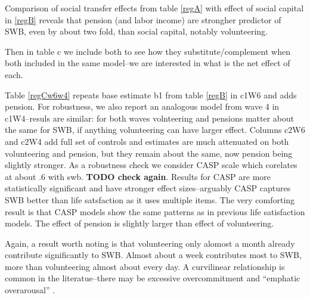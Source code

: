\documentclass[10pt, letterpaper]{article}
\begin{document}
\begin{spacing}{1.4}
Comparison of social transfer effects from table \ref{regA} with effect of 
 social capital in \ref{regB} reveals that pension (and labor income) are
 strongher  predictor of SWB, even by about two fold,  than social capital, notably volunteering.

Then in table c we include both to see how they substitute/complement
when both included in the same model--we are interested in what is the net
effect of each.

Table \ref{regCw6w4} repeats base estimate b1 from table \ref{regB} in c1W6 and
adds pension. For
robustness, we also report an analogous model from wave 4 in c1W4--resuls are
similar: for both waves volnteering and pensions matter about the same for SWB,
if anything volunteering can have larger effect.
% 
Columns c2W6 and c2W4 add full set of controls and estimates are much attenuated
on both volunteering and pension, but they remain about the same, now pension
being slightly stronger.
%
As a robustness check we consider CASP scale which corelates at about .6 with
swb. \textbf{TODO check again}. Results for CASP are more statistically
significant and have stronger effect sizes--arguably CASP captures SWB better
than life satsfaction as it uses multiple items. The very comforting result is
that CASP models show the same patterns as in previous life satisfaction
models. The effect of pension is slightly larger than effect of volunteering.

Again, a result worth noting is that volunteering only alomost a month already
contribute significantly to SWB. Almost about a week contributes most
to SWB, more than volunteering almost about every day. A curvilinear
relationship is common in the literatue--there may be excessive overcommitment
and ``emphatic overarousal''  \citep{wilson12B}.%



\end{spacing}
\end{document}
